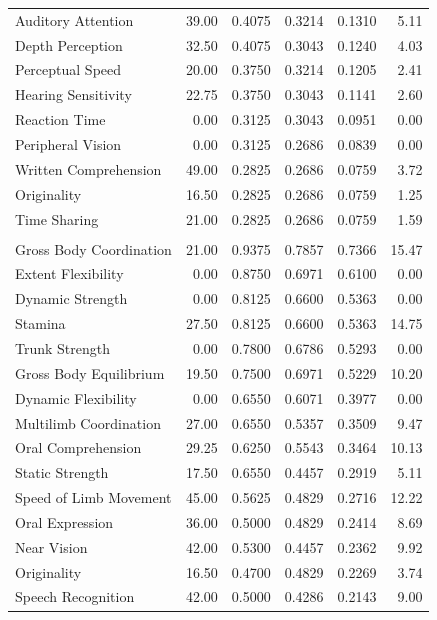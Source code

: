 \begin{longtable}{lrrrrr}
  Auditory Attention & 39.00 & 0.4075 & 0.3214 & 0.1310 & 5.11 \\
  Depth Perception & 32.50 & 0.4075 & 0.3043 & 0.1240 & 4.03 \\
  Perceptual Speed & 20.00 & 0.3750 & 0.3214 & 0.1205 & 2.41 \\
  Hearing Sensitivity & 22.75 & 0.3750 & 0.3043 & 0.1141 & 2.60 \\
  Reaction Time & 0.00 & 0.3125 & 0.3043 & 0.0951 & 0.00 \\
  Peripheral Vision & 0.00 & 0.3125 & 0.2686 & 0.0839 & 0.00 \\
  Written Comprehension & 49.00 & 0.2825 & 0.2686 & 0.0759 & 3.72 \\
  Originality & 16.50 & 0.2825 & 0.2686 & 0.0759 & 1.25 \\
  Time Sharing & 21.00 & 0.2825 & 0.2686 & 0.0759 & 1.59 \\
\addlinespace[0.5em]
\multicolumn{6}{@{}p{0.95\textwidth}@{}}{\textbf{Lowest exposure: Dancers} \hfill \textbf{Final BWI score: 24.52}}\\
\midrule
  Gross Body Coordination & 21.00 & 0.9375 & 0.7857 & 0.7366 & 15.47 \\
  Extent Flexibility & 0.00 & 0.8750 & 0.6971 & 0.6100 & 0.00 \\
  Dynamic Strength & 0.00 & 0.8125 & 0.6600 & 0.5363 & 0.00 \\
  Stamina & 27.50 & 0.8125 & 0.6600 & 0.5363 & 14.75 \\
  Trunk Strength & 0.00 & 0.7800 & 0.6786 & 0.5293 & 0.00 \\
  Gross Body Equilibrium & 19.50 & 0.7500 & 0.6971 & 0.5229 & 10.20 \\
  Dynamic Flexibility & 0.00 & 0.6550 & 0.6071 & 0.3977 & 0.00 \\
  Multilimb Coordination & 27.00 & 0.6550 & 0.5357 & 0.3509 & 9.47 \\
  Oral Comprehension & 29.25 & 0.6250 & 0.5543 & 0.3464 & 10.13 \\
  Static Strength & 17.50 & 0.6550 & 0.4457 & 0.2919 & 5.11 \\
  Speed of Limb Movement & 45.00 & 0.5625 & 0.4829 & 0.2716 & 12.22 \\
  Oral Expression & 36.00 & 0.5000 & 0.4829 & 0.2414 & 8.69 \\
  Near Vision & 42.00 & 0.5300 & 0.4457 & 0.2362 & 9.92 \\
  Originality & 16.50 & 0.4700 & 0.4829 & 0.2269 & 3.74 \\
  Speech Recognition & 42.00 & 0.5000 & 0.4286 & 0.2143 & 9.00 \\

\end{longtable}
